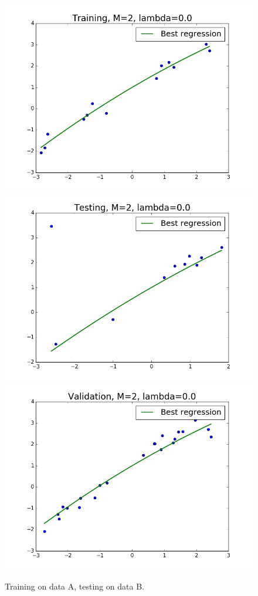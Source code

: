 \documentclass{article}
\begin{document}
\begin{figure}[width=\linewidth]
\centering
\begin{multicols}{2}
  \includegraphics[width=1.2\linewidth]{code/P3/training,training_a,testing_b.png}
  \includegraphics[width=1.2\linewidth]{code/P3/testing,training_a,testing_b.png}
  \includegraphics[width=1.2\linewidth]{code/P3/validation,training_a,testing_b.png}
\end{multicols}
\caption{Training on data A, testing on data B.}
\end{figure}
\end{document}
